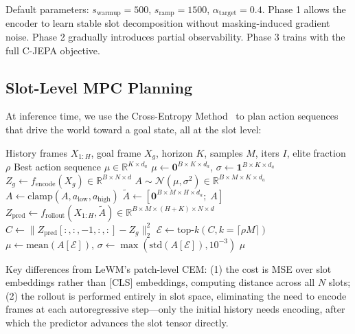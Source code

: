 \documentclass[12pt]{article}
\begin{document}
Default parameters: $s_{\text{warmup}} = 500$, $s_{\text{ramp}} = 1500$, $\alpha_{\text{target}} = 0.4$. Phase 1 allows the encoder to learn stable slot decomposition without masking-induced gradient noise. Phase 2 gradually introduces partial observability. Phase 3 trains with the full C-JEPA objective.

\subsection{Slot-Level MPC Planning}

At inference time, we use the Cross-Entropy Method~\citep{rubinstein2004cem} to plan action sequences that drive the world toward a goal state, all at the slot level:

\begin{algorithm}[t]
\caption{Slot-Level CEM MPC}
\label{alg:cem}
\begin{algorithmic}[1]
\Require History frames $X_{1:H}$, goal frame $X_g$, horizon $K$, samples $M$, iters $I$, elite fraction $\rho$
\Ensure Best action sequence $\mu \in \mathbb{R}^{K \times d_a}$
\State $\mu \gets \bm{0}^{B \times K \times d_a}$, $\sigma \gets \bm{1}^{B \times K \times d_a}$
\State $Z_g \gets f_{\text{encode}}(X_g) \in \mathbb{R}^{B \times N \times d}$ 
    \State $A \sim \mathcal{N}(\mu, \sigma^2) \in \mathbb{R}^{B \times M \times K \times d_a}$ 
    \State $A \gets \text{clamp}(A, a_{\text{low}}, a_{\text{high}})$
    \State $\tilde{A} \gets [\bm{0}^{B \times M \times H \times d_a};\; A]$ 
    \State $Z_{\text{pred}} \gets f_{\text{rollout}}(X_{1:H}, \tilde{A}) \in \mathbb{R}^{B \times M \times (H+K) \times N \times d}$
    \State $C \gets \|Z_{\text{pred}}[:,:,-1,:,:] - Z_g\|_2^2$ 
    \State $\mathcal{E} \gets \text{top-}k(C, k = \lceil \rho M \rceil)$ 
    \State $\mu \gets \text{mean}(A[\mathcal{E}])$, $\sigma \gets \max(\text{std}(A[\mathcal{E}]), 10^{-3})$
\EndFor
\State \Return $\mu$
\end{algorithmic}
\end{algorithm}

Key differences from LeWM's patch-level CEM: (1) the cost is MSE over slot embeddings rather than [CLS] embeddings, computing distance across all $N$ slots; (2) the rollout is performed entirely in slot space, eliminating the need to encode frames at each autoregressive step---only the initial history needs encoding, after which the predictor advances the slot tensor directly.
\end{document}
